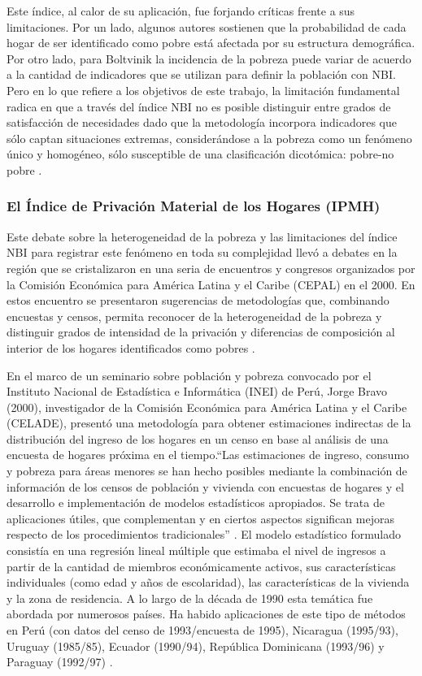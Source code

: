 Este índice, al calor de su aplicación, fue forjando críticas frente a sus limitaciones. Por un lado, algunos autores sostienen \cite{alvarez1997} que la probabilidad de cada hogar de ser identificado como pobre está afectada por su estructura demográfica. Por otro lado, para Boltvinik \citeyear{boltvinik1992} la incidencia de la pobreza puede variar de acuerdo a la cantidad de indicadores que se utilizan para definir la población con NBI. Pero en lo que refiere a los objetivos de este trabajo, la limitación fundamental radica en que a través del índice NBI no es posible distinguir entre grados de satisfacción de necesidades dado que la metodología incorpora indicadores que sólo captan situaciones extremas, considerándose a la pobreza como un fenómeno único y homogéneo, sólo susceptible de una clasificación dicotómica: pobre-no pobre \cite{indec1996,minujin}. 


\subsubsection{El Índice de Privación Material de los Hogares (IPMH)}


Este debate sobre la heterogeneidad de la pobreza y las limitaciones del índice NBI para registrar este fenómeno en toda su complejidad llevó a debates en la región que se cristalizaron en una seria de encuentros y congresos organizados por la Comisión Económica para América Latina y el Caribe (CEPAL) en el 2000. En estos encuentro se presentaron sugerencias de metodologías que, combinando encuestas y censos, permita reconocer de la heterogeneidad de la pobreza y distinguir grados de intensidad de la privación y diferencias de composición al interior de los hogares identificados como pobres \cite{bravo2000a,bravo2000b}. 

En el marco de un seminario sobre población y pobreza convocado por el Instituto Nacional de Estadística e Informática (INEI) de Perú, Jorge Bravo (2000), investigador de la Comisión Económica para América Latina y el Caribe (CELADE), presentó una metodología para obtener estimaciones indirectas de la distribución del ingreso de los hogares en un censo en base al análisis de una encuesta de hogares próxima en el tiempo.“Las estimaciones de ingreso, consumo y pobreza para áreas menores se han hecho posibles mediante la combinación de información de los censos de población y vivienda con encuestas de hogares y el desarrollo e implementación de modelos estadísticos apropiados. Se trata de aplicaciones útiles, que complementan y en ciertos aspectos significan mejoras respecto de los procedimientos tradicionales” \cite[~225]{bravo2000a}. El modelo estadístico formulado consistía en una regresión lineal múltiple que estimaba el nivel de ingresos a partir de la cantidad de miembros económicamente activos, sus características individuales (como edad y años de escolaridad), las características de la vivienda y la zona de residencia. A lo largo de la década de 1990 esta temática fue abordada por numerosos países. Ha habido aplicaciones de este tipo de métodos en Perú (con datos del censo de 1993/encuesta de 1995), Nicaragua (1995/93), Uruguay (1985/85), Ecuador (1990/94), República Dominicana (1993/96) y Paraguay (1992/97) \cite{bravo2000a,bravo2000b}.

